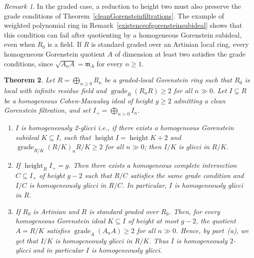 \documentclass[11pt,letterpaper]{amsart}
\newcommand{\seq}{\subseteq}
\DeclareMathOperator{\gr}{grade}
\DeclareMathOperator{\height}{height}
\theoremstyle{plain}
\newtheorem{thm}{Theorem}[section]
\theoremstyle{definition}
\theoremstyle{remark}
\newtheorem{remark}[thm]{Remark}
\begin{document}
\begin{remark}\label{rem:clean-gorenstein-grading}
In the graded case, a reduction to height two must also preserve the
grade conditions of Theorem~\ref{cleanGorensteinfiltrations}. The example of weighted polynomial ring in
Remark~\ref{existenceofgorensteinsubideal}
shows that this condition can fail after quotienting by a
homogeneous Gorenstein subideal, even when $R_0$ is a field. If $R$ is
standard graded over an Artinian local ring, every homogeneous Gorenstein
quotient $A$ of dimension at least two satisfies the grade conditions,
since $\sqrt{A_nA}=\mathfrak m_A$ for every $n\geq 1$.
\end{remark}

\begin{thm}\label{thm:clean-gorenstein-graded}
Let \(R=\bigoplus_{n\geq 0}R_n\) be a graded-local Gorenstein ring such
that \(R_0\) is local with infinite residue field and
\(\gr_R(R_nR)\geq 2\) for all \(n\gg 0\). Let \(I\subsetneq R\) be a
homogeneous Cohen-Macaulay ideal of height \(g\geq 2\) admitting a clean
Gorenstein filtration, and set \(I_+=\bigoplus_{n>0}I_n\).

\begin{enumerate}
\item[\textup{(a)}] $I$ is homogeneously 2-glicci i.e., if there exists a homogeneous Gorenstein subideal $K\seq I$, such that $\height I=\height K+2$ and $\gr_{R/K}(R/K)_nR/K\ge 2$ for all $n\gg 0$; then $I/K$ is glicci in $R/K$.

\item[\textup{(b)}] If \(\height_R I_+=g\). Then there exists a
homogeneous complete intersection \(C\subseteq I_+\) of height \(g-2\)
such that \(R/C\) satisfies the same grade condition and \(I/C\) is
homogeneously glicci in \(R/C\). In particular, \(I\) is homogeneously
glicci in \(R\).

\item[\textup{(c)}] If \(R_0\) is Artinian and $R$ is standard graded over $R_0$. Then, for every homogeneous Gorenstein
ideal \(K\subseteq I\) of height at most \(g-2\), the quotient
\(A=R/K\) satisfies $  \gr_A(A_nA)\geq 2$ for all $n\gg0$. 
Hence, by part~\textup{(a)}, we get 
that \(I/K\) is homogeneously glicci in \(R/K\).
Thus \(I\) is homogeneously \(2\)-glicci and in particular $I$ is homogeneously glicci.
\end{enumerate}
\end{thm}
\end{document}
